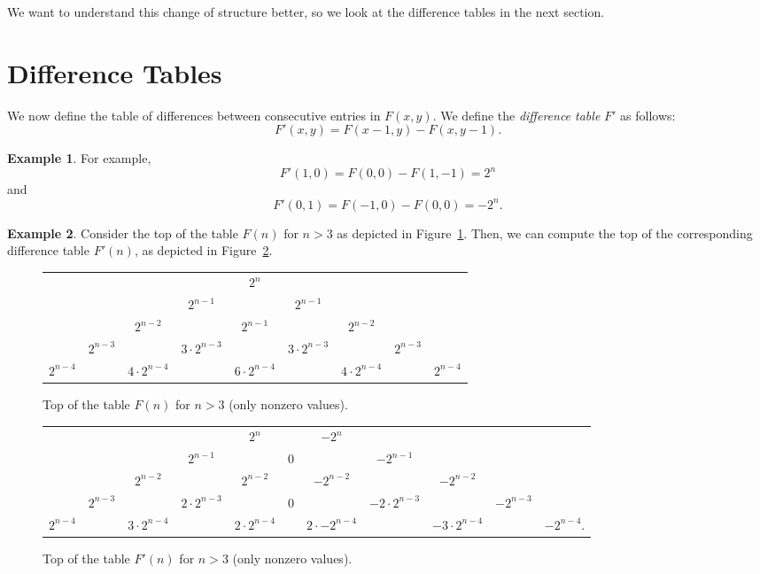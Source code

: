\documentclass[11pt]{article}
\theoremstyle{definition}
\newtheorem{example}{Example}
\theoremstyle{remark}
\begin{document}
We want to understand this change of structure better, so we look at the difference tables in the next section.








\section{Difference Tables}\label{sec:DiffTables}

We now define the table of differences between consecutive entries in $F(x, y)$. We define the \emph{difference table} $F'$ as follows:
\[F'(x,y) = F(x-1,y) - F(x,y-1).\]
\begin{example}
    For example,
    \[F'(1,0) = F(0,0) - F(1,-1) = 2^n\]
    and
    \[F'(0,1) = F(-1,0) - F(0,0) = -2^n.\]
\end{example}

\begin{example}\label{ex:Beginning_of_table}
Consider the top of the table $F(n)$ for $n>3$ as depicted in Figure~\ref{fig:Table1}. Then, we can compute the top of the corresponding difference table $F'(n)$, as depicted in Figure~\ref{fig:Table2}.
\begin{figure}[ht!]
\begin{center}
  \begin{tabular}{ccccccccc}
        & & &  & $2^n$  & & &  \\
      &  & & $2^{n-1}$ &  &  $2^{n-1}$ & &  \\  
      & & $2^{n-2}$ &  & $2^{n-1}$ & &  $2^{n-2}$ & \\ 
      & $2^{n-3}$ & & $3 \cdot 2^{n-3}$ & & $3 \cdot 2^{n-3}$ & & $2^{n-3}$ \\ 
      \textbf{$2^{n-4}$} & & $4 \cdot 2^{n-4}$ & & $6 \cdot 2^{n-4}$ & & $4 \cdot 2^{n-4}$  &  & \textbf{$2^{n-4}$} \\ 
  \end{tabular} 
\end{center}
  \caption{Top of the table $F(n)$ for $n > 3$ (only nonzero values).}
\label{fig:Table1}
\end{figure}
\begin{figure}[ht!]
\begin{center}
  \begin{tabular}{ccccccccccc}
      & & & & $2^n$ & & $-2^n$  & & & & \\
      & & & $2^{n-1}$ & & 0 & & $-2^{n-1}$ & & & \\  
      & & $2^{n-2}$ & & $2^{n-2}$ & & $-2^{n-2}$ & & $-2^{n-2}$ & &\\ 
      & $2^{n-3}$ & & $2 \cdot 2^{n-3}$ & & 0 & & $-2 \cdot 2^{n-3}$ & & $-2^{n-3}$ & \\ 
      $2^{n-4}$ & & $3 \cdot 2^{n-4}$ & & $2 \cdot 2^{n-4}$ & & $2 \cdot -2^{n-4}$ & & $-3 \cdot 2^{n-4}$  &  & $-2^{n-4}$. \\ 
  \end{tabular}
\end{center}
\caption{Top of the table $F'(n)$ for $n > 3$ (only nonzero values).}
      \label{fig:Table2}
\end{figure}
\end{example}
\end{document}
